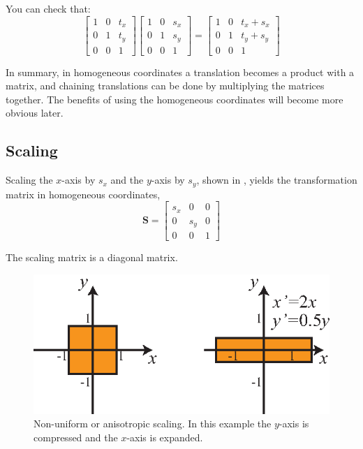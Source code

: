You can check that:
\begin{equation}
    \begin{bmatrix}
    1 & 0 & t_x \\
    0 & 1 & t_y \\
    0 & 0 & 1
    \end{bmatrix}
    \begin{bmatrix}
    1 & 0 & s_x \\
    0 & 1 & s_y \\
    0 & 0 & 1
    \end{bmatrix}
    =
    \begin{bmatrix}
    1 & 0 & t_x+s_x \\
    0 & 1 & t_y+s_y \\
    0 & 0 & 1
    \end{bmatrix}
\end{equation}

In summary, in homogeneous coordinates a translation becomes a product with a matrix, and chaining translations can be done by multiplying the matrices together. The benefits of using the homogeneous coordinates will become more obvious later.

\subsection{Scaling}

Scaling the $x$-axis by $s_x$ and the $y$-axis by $s_y$, shown in \fig{\ref{fig:scaling}}, yields the transformation matrix in homogeneous coordinates,
\begin{equation}
    \mathbf{S} =             
    \begin{bmatrix}
    s_x & 0 & 0 \\
    0 & s_y & 0 \\
    0 & 0 & 1
    \end{bmatrix}
\end{equation}

The scaling matrix is a diagonal matrix. 

\begin{figure}[ht]
\centerline{
\includegraphics[width=.6\linewidth]{figures/imaging_geometry/scaling.eps}
}
\caption{Non-uniform or anisotropic scaling. In this example the $y$-axis is compressed and the $x$-axis is expanded.}
\label{fig:scaling}
\end{figure}

